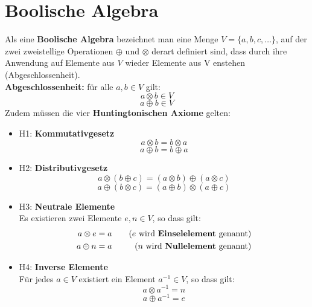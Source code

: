\documentclass[12pt]{article}
\begin{document}
\section{Boolische Algebra}
Als eine \textbf{Boolische Algebra} bezeichnet man eine Menge $V = \{a,b,c,\dots\}$, auf der zwei zweistellige Operationen $\oplus$ und $\otimes$ derart definiert sind, dass durch ihre Anwendung auf Elemente aus $V$ wieder Elemente aus V enstehen (Abgeschlossenheit).\\
\newline
\textbf{Abgeschlossenheit:} für alle $a,b \in V$ gilt: \[a \otimes b \in V \]\[ a \oplus b \in V\]
\newpage
Zudem müssen die vier \textbf{Huntingtonischen Axiome} gelten:
\begin{itemize}
    \item H1: \textbf{Kommutativgesetz}
        \[a \otimes b = b \otimes a\]
        \[a \oplus b = b \oplus a\]
    \item H2: \textbf{Distributivgesetz}
        \[a \otimes (b \oplus c) = (a \otimes b) \oplus (a \otimes c)\]
        \[a \oplus (b \otimes c) = (a \oplus b) \otimes (a \oplus c)\]
    \item H3: \textbf{Neutrale Elemente} \\ Es existieren zwei Elemente $e,n \in V$, so dass gilt: \\
        \begin{align*}
            a \otimes e &= a \quad &(\text{$e$ wird \textbf{Einselelement} genannt})\\
            a \oplus n &= a \quad &(\text{$n$ wird \textbf{Nullelement} genannt})
        \end{align*}
    \item H4: \textbf{Inverse Elemente} \\ Für jedes $a \in V$ existiert ein Element $a^{-1} \in V$, so dass gilt: \\
        \[a \otimes a^{-1} = n\]
        \[a \oplus a^{-1} = e\]
\end{itemize}
\end{document}
